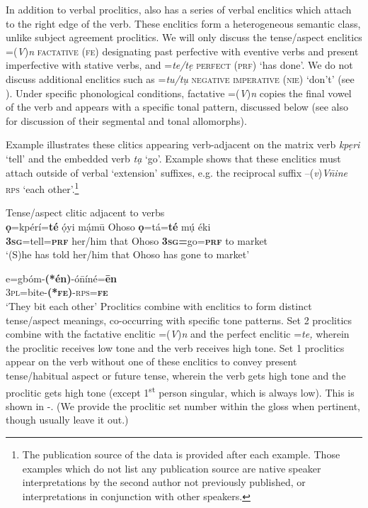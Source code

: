 \documentclass[output=paper]{langsci/langscibook}
\begin{document}
In addition to verbal proclitics,  also has a series of verbal enclitics which attach to the right edge of the verb. These enclitics form a heterogeneous semantic class, unlike subject agreement proclitics. We will only discuss the tense/aspect enclitics =(\textit{V})\textit{n} \textsc{factative (fe)} designating past perfective with eventive verbs and present imperfective with stative verbs, and =\textit{te/tẹ} \textsc{perfect} (\textsc{prf}) ‘has done’. We do not discuss additional enclitics such as =\textit{tu/tụ} \textsc{negative imperative (nie)} ‘don’t’ (see \citealt{Kari2004}). Under specific phonological conditions, factative =(\textit{V})\textit{n} copies the final vowel of the verb and appears with a specific tonal pattern, discussed below (see also \citealt[340-342]{Kari2004}  for discussion of their segmental and tonal allomorphs).   

Example  illustrates these clitics appearing verb-adjacent on the matrix verb \textit{kpẹri} ‘tell’ and the embedded verb \textit{tạ} ‘go’. Example  shows that these enclitics must attach outside of verbal ‘extension’ suffixes, e.g. the reciprocal suffix –(\textit{v})\textit{V\={n}ine} \textsc{rps} ‘each other’.\footnote{The publication source of the  data is provided after each example. Those examples which do not list any publication source are native speaker interpretations by the second author not previously published, or interpretations in conjunction with other  speakers. 
}


\ea
{Tense/aspect clitic adjacent to verbs}\\
   \ea\label{ex:rolle:1}
\gll   \textbf{ọ}=kpérí=\textbf{té}   ọ́yi     mạ́mū   Ohoso   \textbf{ọ}=tá=\textbf{té}     mụ́  éki\\
      \textbf{3}\textbf{\textsc{sg}}=tell=\textbf{\textsc{prf}}   her/him  that     Ohoso  \textbf{3}\textbf{\textsc{sg}}\textbf{=}go=\textbf{\textsc{prf}}  to  market\\
\glt   ‘(S)he has told her/him that Ohoso has gone to market’ \citep[63]{Kari2004}

\ex\label{ex:rolle:2}
\gll   e=gbóm-\textbf{(*én)}{}-ó\={n}íné=\textbf{ēn}\\
       3\textsc{pl}=bite-\textbf{(*}\textbf{\textsc{fe}}\textbf{)}{}-\textsc{rps}=\textbf{\textsc{fe}}\\
\glt   ‘They bit each other’ \citep[149]{Kari2004}
\z
\z 
Proclitics combine with enclitics to form distinct tense/aspect meanings, co-occurring with specific tone patterns. Set 2 proclitics combine with the factative enclitic =(\textit{V})\textit{n} and the perfect enclitic =\textit{te,} wherein the proclitic receives low tone and the verb receives high tone. Set 1 proclitics appear on the verb without one of these enclitics to convey present tense/habitual aspect or future tense, wherein the verb gets high tone and the proclitic gets high tone (except 1\textsuperscript{st} person singular, which is always low). This is shown in -. (We provide the proclitic set number within the gloss when pertinent, though usually leave it out.)
\end{document}
